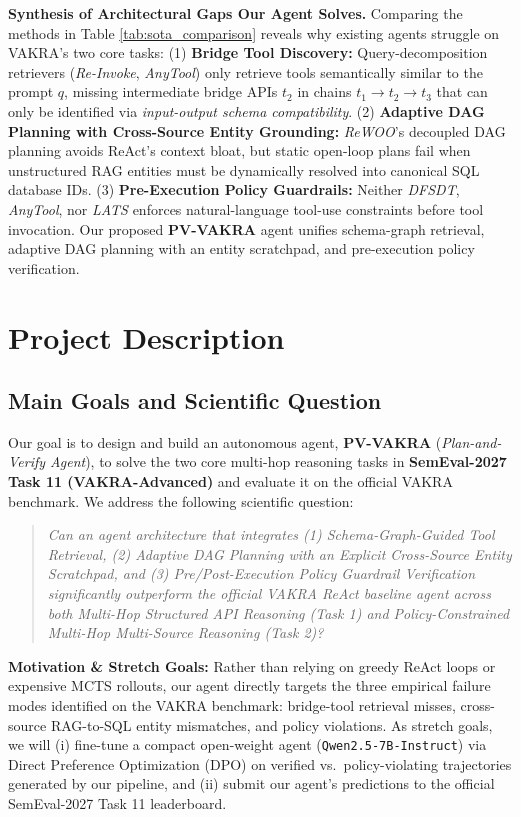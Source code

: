 \documentclass[10pt]{article}
\begin{document}
\textbf{Synthesis of Architectural Gaps Our Agent Solves.}
Comparing the methods in Table \ref{tab:sota_comparison} reveals why existing agents struggle on VAKRA's two core tasks:
(1) \textbf{Bridge Tool Discovery:} Query-decomposition retrievers (\textit{Re-Invoke}, \textit{AnyTool}) only retrieve tools semantically similar to the prompt $q$, missing intermediate bridge APIs $t_2$ in chains $t_1 \rightarrow t_2 \rightarrow t_3$ that can only be identified via \textit{input-output schema compatibility}.
(2) \textbf{Adaptive DAG Planning with Cross-Source Entity Grounding:} \textit{ReWOO}'s decoupled DAG planning avoids ReAct's context bloat, but static open-loop plans fail when unstructured RAG entities must be dynamically resolved into canonical SQL database IDs.
(3) \textbf{Pre-Execution Policy Guardrails:} Neither \textit{DFSDT}, \textit{AnyTool}, nor \textit{LATS} enforces natural-language tool-use constraints before tool invocation. Our proposed \textbf{PV-VAKRA} agent unifies schema-graph retrieval, adaptive DAG planning with an entity scratchpad, and pre-execution policy verification.

\clearpage
\section{Project Description}

\subsection{Main Goals and Scientific Question}
Our goal is to design and build an autonomous agent, \textbf{PV-VAKRA} (\textit{Plan-and-Verify Agent}), to solve the two core multi-hop reasoning tasks in \textbf{SemEval-2027 Task 11 (VAKRA-Advanced)} and evaluate it on the official VAKRA benchmark. We address the following scientific question:
\begin{quote}
\vspace{-0.15cm}
\textit{Can an agent architecture that integrates (1) Schema-Graph-Guided Tool Retrieval, (2) Adaptive DAG Planning with an Explicit Cross-Source Entity Scratchpad, and (3) Pre/Post-Execution Policy Guardrail Verification significantly outperform the official VAKRA ReAct baseline agent across both Multi-Hop Structured API Reasoning (Task 1) and Policy-Constrained Multi-Hop Multi-Source Reasoning (Task 2)?}
\vspace{-0.15cm}
\end{quote}
\textbf{Motivation \& Stretch Goals:} Rather than relying on greedy ReAct loops or expensive MCTS rollouts, our agent directly targets the three empirical failure modes identified on the VAKRA benchmark: bridge-tool retrieval misses, cross-source RAG-to-SQL entity mismatches, and policy violations. As stretch goals, we will (i) fine-tune a compact open-weight agent (\texttt{Qwen2.5-7B-Instruct}) via Direct Preference Optimization (DPO) on verified vs.\ policy-violating trajectories generated by our pipeline, and (ii) submit our agent's predictions to the official SemEval-2027 Task 11 leaderboard.
\end{document}
